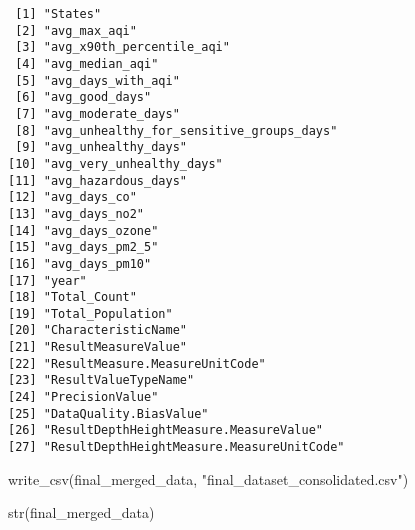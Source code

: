 \documentclass[
  12pt,
]{article}
\newenvironment{Shaded}{\begin{snugshade}}{\end{snugshade}}
\newcommand{\FunctionTok}[1]{\textcolor[rgb]{0.28,0.35,0.67}{#1}}
\newcommand{\NormalTok}[1]{\textcolor[rgb]{0.00,0.23,0.31}{#1}}
\newcommand{\StringTok}[1]{\textcolor[rgb]{0.13,0.47,0.30}{#1}}
\begin{document}
\begin{verbatim}
 [1] "States"                                  
 [2] "avg_max_aqi"                             
 [3] "avg_x90th_percentile_aqi"                
 [4] "avg_median_aqi"                          
 [5] "avg_days_with_aqi"                       
 [6] "avg_good_days"                           
 [7] "avg_moderate_days"                       
 [8] "avg_unhealthy_for_sensitive_groups_days" 
 [9] "avg_unhealthy_days"                      
[10] "avg_very_unhealthy_days"                 
[11] "avg_hazardous_days"                      
[12] "avg_days_co"                             
[13] "avg_days_no2"                            
[14] "avg_days_ozone"                          
[15] "avg_days_pm2_5"                          
[16] "avg_days_pm10"                           
[17] "year"                                    
[18] "Total_Count"                             
[19] "Total_Population"                        
[20] "CharacteristicName"                      
[21] "ResultMeasureValue"                      
[22] "ResultMeasure.MeasureUnitCode"           
[23] "ResultValueTypeName"                     
[24] "PrecisionValue"                          
[25] "DataQuality.BiasValue"                   
[26] "ResultDepthHeightMeasure.MeasureValue"   
[27] "ResultDepthHeightMeasure.MeasureUnitCode"
\end{verbatim}

\begin{Shaded}
\begin{Highlighting}[]
\FunctionTok{write\_csv}\NormalTok{(final\_merged\_data, }\StringTok{"final\_dataset\_consolidated.csv"}\NormalTok{)}
\end{Highlighting}
\end{Shaded}

\begin{Shaded}
\begin{Highlighting}[]
\FunctionTok{str}\NormalTok{(final\_merged\_data)}
\end{Highlighting}
\end{Shaded}
\end{document}
